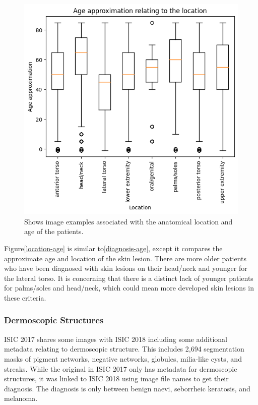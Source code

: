 \begin{figure}
    \centering
    \includegraphics[scale=0.75]{images/ISIC/location-age.png}
    \caption{Shows image examples associated with the anatomical location and age of the patients.} 
\end{figure}\label{location-age}

Figure\ref{location-age} is similar to\ref{diagnosis-age}, except it compares the approximate age and location of the skin lesion. There are more older patients who have been diagnosed with skin lesions on their head/neck and younger for the lateral torso. It is concerning that there is a distinct lack of younger patients for palms/soles and head/neck, which could mean more developed skin lesions in these criteria.

\subsubsection{Dermoscopic Structures}
ISIC 2017 shares some images with ISIC 2018 including some additional metadata relating to dermoscopic structure. This includes 2,694 segmentation masks of pigment networks, negative networks, globules, milia-like cysts, and streaks. While the original in ISIC 2017 only has metadata for dermoscopic structures, it was linked to ISIC 2018 using image file names to get their diagnosis. The diagnosis is only between benign naevi, seborrheic keratosis, and melanoma. 

